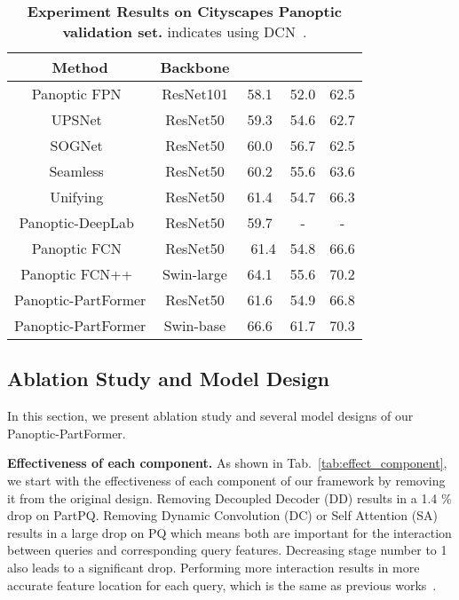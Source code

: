 \begin{table}[t]
\centering
\begin{adjustbox}{width=0.42\textwidth}
\begin{tabular}{c c c c c}
\toprule[0.15em]
\textbf{Method}  &  Backbone  &  &  &   \\ 
\midrule[0.15em]
Panoptic FPN~\cite{kirillov2019panopticfpn} & ResNet101 & 58.1 & 52.0 & 62.5 \\
  UPSNet~\cite{xiong2019upsnet} & ResNet50 & 59.3 & 54.6 & 62.7 \\
  SOGNet~\cite{yang2019sognet} & ResNet50 & 60.0 & { 56.7} & 62.5 \\
  Seamless~\cite{porzi2019seamless} & ResNet50 & 60.2 & 55.6 & 63.6 \\
  Unifying~\cite{li2020unifying} & ResNet50 & 61.4 & 54.7 & 66.3 \\
  Panoptic-DeepLab~\cite{cheng2020panoptic} & ResNet50 & 59.7 & - & - \\
  Panoptic FCN~\cite{li2020panopticFCN} & ResNet50 & {\ 61.4} & 54.8 & { 66.6} \\
  Panoptic FCN++~\cite{li2021fully} & Swin-large & 64.1 & 55.6 & 70.2 \\
  \hline
Panoptic-PartFormer & ResNet50 & 61.6 & 54.9 & 66.8 \\
Panoptic-PartFormer & Swin-base & 66.6 & 61.7 & 70.3 \\
\bottomrule
\end{tabular}
\end{adjustbox}
\caption{ \small \textbf{Experiment Results on Cityscapes Panoptic validation set.} indicates using DCN~\cite{deformablev2}.}
\label{tab:experiments_res_cityscapes}
\end{table}





\subsection{Ablation Study and Model Design}
\label{sec:ablation}
In this section, we present ablation study and several model designs of our Panoptic-PartFormer. 

\noindent
\textbf{Effectiveness of each component.} As shown in Tab.~\ref{tab:effect_component}, we start with the effectiveness of each component of our framework by removing it from the original design. Removing Decoupled Decoder (DD) results in a 1.4 \% drop on PartPQ. Removing Dynamic Convolution (DC) or Self Attention (SA) results in a large drop on PQ which means both are important for the interaction between queries and corresponding query features. Decreasing stage number to 1 also leads to a significant drop. Performing more interaction results in more accurate feature location for each query, which is the same as previous works~\cite{zhang2021knet,peize2020sparse}.


